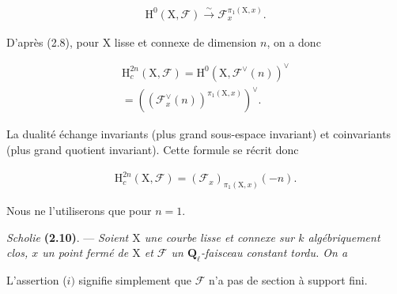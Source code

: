 \documentclass[10pt,leqno]{article}
\begin{document}
\begin{equation*}\begin{gathered}\mathrm{H}^{0}(\mathrm{X},\mathcal{F} ) \xrightarrow{\sim } \mathcal{F} _{x}^{\pi _{1}(\mathrm{X},x)}.\end{gathered}\tag{2.9.1}\end{equation*}

\noindent D’après (2.8), pour \(\mathrm{X}\) lisse et connexe de dimension \(n\), on a donc\par

\begin{equation*}\begin{gathered}\mathrm{H}_{c}^{2n}(\mathrm{X},\mathcal{F} ) = \mathrm{H}^{0}(\mathrm{X},\mathcal{F} ^{\vee }(n))^{\vee } \\ = ((\mathcal{F} _{x}^{\vee }(n))^{\pi _{1}(\mathrm{X},x)})^{\vee }.\end{gathered}\end{equation*}

\noindent La dualité échange invariants (plus grand sous-espace invariant) et coinvariants (plus grand quotient invariant). Cette formule se récrit donc\par

\begin{equation*}\begin{gathered}\mathrm{H}_{c}^{2n}(\mathrm{X},\mathcal{F} ) = (\mathcal{F} _{x})_{\pi _{1}(\mathrm{X},x)}(- n).\end{gathered}\end{equation*}

\noindent Nous ne l’utiliserons que pour \(n=1\).\par

\noindent \emph{Scholie} \textbf{(2.10)}. — {\itshape Soient \(\mathrm{X}\) une courbe lisse et connexe sur \(k\) algébriquement clos, \(x\) un point fermé de \(\mathrm{X}\) et \(\mathcal{F} \) un \(\mathbf{Q}_{\ell }\)-faisceau constant tordu. On a}\par

\par

\noindent L’assertion (\(i)\) signifie simplement que \(\mathcal{F} \) n’a pas de section à support fini.\par
\end{document}
